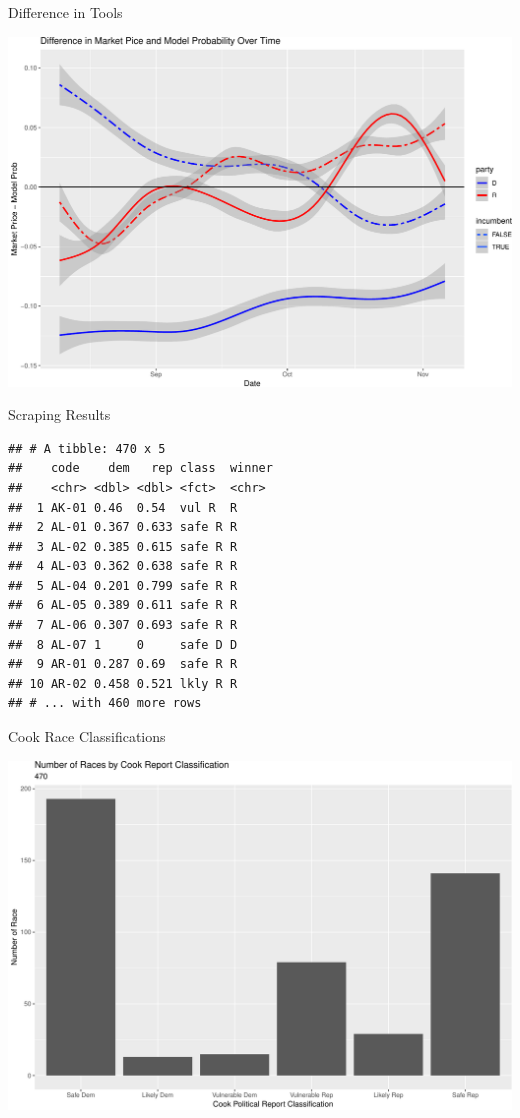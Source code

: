 \documentclass[ignorenonframetext,]{beamer}
\begin{document}
\begin{frame}{Difference in Tools}

\includegraphics{markets_models_files/figure-beamer/diff-1.pdf}

\end{frame}

\begin{frame}[fragile]{Scraping Results}

\begin{verbatim}
## # A tibble: 470 x 5
##    code    dem   rep class  winner
##    <chr> <dbl> <dbl> <fct>  <chr> 
##  1 AK-01 0.46  0.54  vul R  R     
##  2 AL-01 0.367 0.633 safe R R     
##  3 AL-02 0.385 0.615 safe R R     
##  4 AL-03 0.362 0.638 safe R R     
##  5 AL-04 0.201 0.799 safe R R     
##  6 AL-05 0.389 0.611 safe R R     
##  7 AL-06 0.307 0.693 safe R R     
##  8 AL-07 1     0     safe D D     
##  9 AR-01 0.287 0.69  safe R R     
## 10 AR-02 0.458 0.521 lkly R R     
## # ... with 460 more rows
\end{verbatim}

\end{frame}

\begin{frame}{Cook Race Classifications}

\includegraphics{markets_models_files/figure-beamer/class all-1.pdf}

\end{frame}
\end{document}
